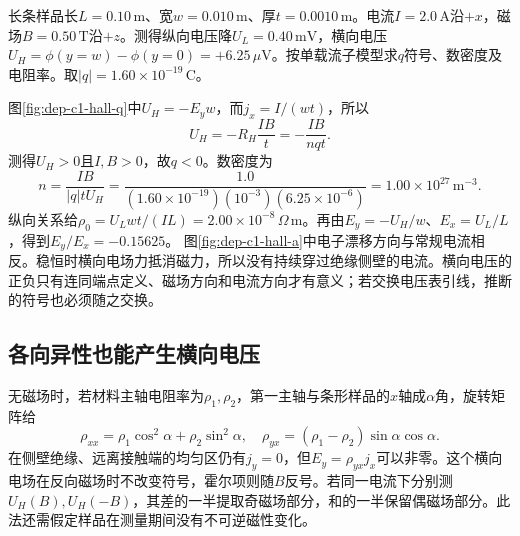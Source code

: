 \begin{example}[用带符号的横向电压识别载流子]
长条样品长$L=0.10\,\mathrm m$、宽$w=0.010\,\mathrm m$、厚$t=0.0010\,\mathrm m$。电流$I=2.0\,\mathrm A$沿$+x$，磁场$B=0.50\,\mathrm T$沿$+z$。测得纵向电压降$U_L=0.40\,\mathrm{mV}$，横向电压$U_H=\phi(y=w)-\phi(y=0)=+6.25\,\mu\mathrm V$。按单载流子模型求$q$符号、数密度及电阻率。取$|q|=1.60\times10^{-19}\,\mathrm C$。
\end{example}
\begin{solution}
图\ref{fig:dep-c1-hall-q}中$U_H=-E_yw$，而$j_x=I/(wt)$，所以
\[
 U_H=-R_H\frac{IB}{t}=-\frac{IB}{nqt}.
\]
测得$U_H>0$且$I,B>0$，故$q<0$。数密度为
\[
 n=\frac{IB}{|q|tU_H}
 =\frac{1.0}{(1.60\times10^{-19})(10^{-3})(6.25\times10^{-6})}
 =1.00\times10^{27}\,\mathrm{m^{-3}}.
\]
纵向关系给$\rho_0=U_Lwt/(IL)=2.00\times10^{-8}\,\Omega\,\mathrm m$。再由$E_y=-U_H/w$、$E_x=U_L/L$，得到$E_y/E_x=-0.15625$。
图\ref{fig:dep-c1-hall-a}中电子漂移方向与常规电流相反。稳恒时横向电场力抵消磁力，所以没有持续穿过绝缘侧壁的电流。横向电压的正负只有连同端点定义、磁场方向和电流方向才有意义；若交换电压表引线，推断的符号也必须随之交换。
\end{solution}

\subsection{各向异性也能产生横向电压}
无磁场时，若材料主轴电阻率为$\rho_1,\rho_2$，第一主轴与条形样品的$x$轴成$\alpha$角，旋转矩阵给
\[
 \rho_{xx}=\rho_1\cos^2\alpha+\rho_2\sin^2\alpha,
 \quad\rho_{yx}=(\rho_1-\rho_2)\sin\alpha\cos\alpha.
\]
在侧壁绝缘、远离接触端的均匀区仍有$j_y=0$，但$E_y=\rho_{yx}j_x$可以非零。这个横向电场在反向磁场时不改变符号，霍尔项则随$B$反号。若同一电流下分别测$U_H(B),U_H(-B)$，其差的一半提取奇磁场部分，和的一半保留偶磁场部分。此法还需假定样品在测量期间没有不可逆磁性变化。

